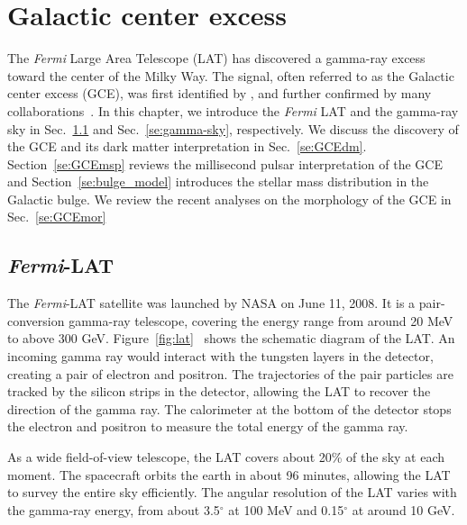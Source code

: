 \documentclass[doublespace,nopageskip]{VTthesis}
\begin{document}
\chapter{Galactic center excess} \label{ch:GCE}

The \emph{Fermi} Large Area Telescope (LAT) has discovered a gamma-ray excess toward the center of the Milky Way. The signal, often referred to as the Galactic center excess (GCE), was first identified by \citet{2009arXiv0910.2998G}, and further confirmed by many collaborations~\cite{2009arXiv0912.3828V,2011PhLB..697..412H,2012PhRvD..86h3511A,2013PhRvD..88h3521G,2014PhRvD..89f3515M,2013PDU.....2..118H,2014PhRvD..90b3526A,2016PDU....12....1D,2015JCAP...03..038C,2015PhRvD..91l3010Z,2016ApJ...819...44A,2017ApJ...840...43A}. {In this chapter, we introduce the \textit{Fermi} LAT and the gamma-ray sky in Sec.~\ref{se:fermi} and Sec.~\ref{se:gamma-sky}, respectively. We discuss the discovery of the GCE and its dark matter interpretation in Sec.~\ref{se:GCEdm}. Section~\ref{se:GCEmsp} reviews the millisecond pulsar interpretation of the GCE and Section~\ref{se:bulge_model} introduces the stellar mass distribution in the Galactic bulge. We review the recent analyses on the morphology of the GCE in Sec.~\ref{se:GCEmor}}

\section{\textit{Fermi}-LAT}\label{se:fermi}

The \textit{Fermi}-LAT satellite was launched by NASA on June 11, 2008. It is a pair-conversion gamma-ray telescope, covering the energy range from around 20 MeV to above 300 GeV. Figure~\ref{fig:lat}~\cite{2009ApJ...697.1071A} shows the schematic diagram of the LAT. An incoming gamma ray would interact with the tungsten layers in the detector, creating a pair of electron and positron. The trajectories of the pair particles are tracked by the silicon strips in the detector, allowing the LAT to recover the direction of the gamma ray. The calorimeter at the bottom of the detector stops the electron and positron to measure the total energy of the gamma ray.

As a wide field-of-view telescope, the LAT covers about 20\% of the sky at each moment. The spacecraft orbits the earth in about 96 minutes, allowing the LAT to survey the entire sky efficiently. The angular resolution of the LAT varies with the gamma-ray energy, from about 3.5$^\circ$ at 100 MeV and 0.15$^\circ$ at around 10 GeV.
\end{document}
